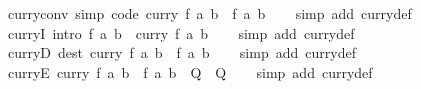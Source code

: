 \begin{isabellebody}
\isanewline
{}\isamarkupfalse%
\ curry{\isacharunderscore}{\kern0pt}conv\ {\isacharbrackleft}{\kern0pt}simp{\isacharcomma}{\kern0pt}\ code{\isacharbrackright}{\kern0pt}{\isacharcolon}{\kern0pt}\ {\isachardoublequoteopen}curry\ f\ a\ b\ {\isacharequal}{\kern0pt}\ f\ {\isacharparenleft}{\kern0pt}a{\isacharcomma}{\kern0pt}\ b{\isacharparenright}{\kern0pt}{\isachardoublequoteclose}\isanewline
%
\isadelimproof
\ \ %
\endisadelimproof
%
\isatagproof
{}\isamarkupfalse%
\ {\isacharparenleft}{\kern0pt}simp\ add{\isacharcolon}{\kern0pt}\ curry{\isacharunderscore}{\kern0pt}def{\isacharparenright}{\kern0pt}%
\endisatagproof
{\isafoldproof}%
%
\isadelimproof
\isanewline
%
\endisadelimproof
\isanewline
{}\isamarkupfalse%
\ curryI\ {\isacharbrackleft}{\kern0pt}intro{\isacharbang}{\kern0pt}{\isacharbrackright}{\kern0pt}{\isacharcolon}{\kern0pt}\ {\isachardoublequoteopen}f\ {\isacharparenleft}{\kern0pt}a{\isacharcomma}{\kern0pt}\ b{\isacharparenright}{\kern0pt}\ {\isasymLongrightarrow}\ curry\ f\ a\ b{\isachardoublequoteclose}\isanewline
%
\isadelimproof
\ \ %
\endisadelimproof
%
\isatagproof
{}\isamarkupfalse%
\ {\isacharparenleft}{\kern0pt}simp\ add{\isacharcolon}{\kern0pt}\ curry{\isacharunderscore}{\kern0pt}def{\isacharparenright}{\kern0pt}%
\endisatagproof
{\isafoldproof}%
%
\isadelimproof
\isanewline
%
\endisadelimproof
\isanewline
{}\isamarkupfalse%
\ curryD\ {\isacharbrackleft}{\kern0pt}dest{\isacharbang}{\kern0pt}{\isacharbrackright}{\kern0pt}{\isacharcolon}{\kern0pt}\ {\isachardoublequoteopen}curry\ f\ a\ b\ {\isasymLongrightarrow}\ f\ {\isacharparenleft}{\kern0pt}a{\isacharcomma}{\kern0pt}\ b{\isacharparenright}{\kern0pt}{\isachardoublequoteclose}\isanewline
%
\isadelimproof
\ \ %
\endisadelimproof
%
\isatagproof
{}\isamarkupfalse%
\ {\isacharparenleft}{\kern0pt}simp\ add{\isacharcolon}{\kern0pt}\ curry{\isacharunderscore}{\kern0pt}def{\isacharparenright}{\kern0pt}%
\endisatagproof
{\isafoldproof}%
%
\isadelimproof
\isanewline
%
\endisadelimproof
\isanewline
{}\isamarkupfalse%
\ curryE{\isacharcolon}{\kern0pt}\ {\isachardoublequoteopen}curry\ f\ a\ b\ {\isasymLongrightarrow}\ {\isacharparenleft}{\kern0pt}f\ {\isacharparenleft}{\kern0pt}a{\isacharcomma}{\kern0pt}\ b{\isacharparenright}{\kern0pt}\ {\isasymLongrightarrow}\ Q{\isacharparenright}{\kern0pt}\ {\isasymLongrightarrow}\ Q{\isachardoublequoteclose}\isanewline
%
\isadelimproof
\ \ %
\endisadelimproof
%
\isatagproof
{}\isamarkupfalse%
\ {\isacharparenleft}{\kern0pt}simp\ add{\isacharcolon}{\kern0pt}\ curry{\isacharunderscore}{\kern0pt}def{\isacharparenright}{\kern0pt}%

\end{isabellebody}
